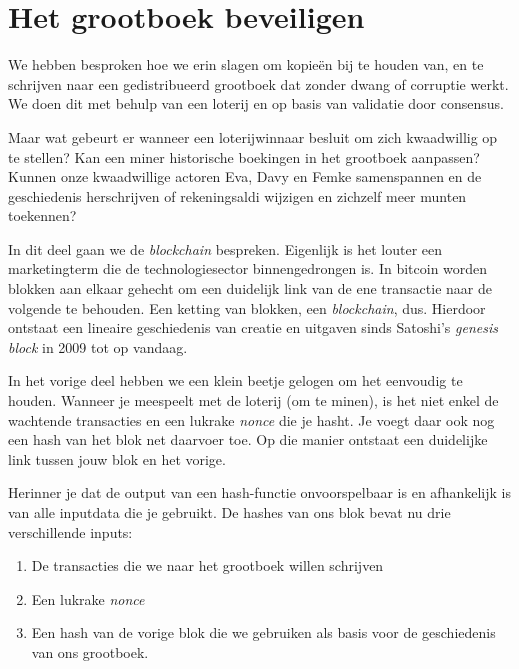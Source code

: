 
\chapter{Het grootboek beveiligen}
We hebben besproken hoe we erin slagen om kopieën bij te houden van, en te schrijven naar een gedistribueerd grootboek dat zonder dwang of corruptie werkt. We doen dit met behulp van een loterij en op basis van validatie door consensus.

Maar wat gebeurt er wanneer een loterijwinnaar besluit om zich kwaadwillig op te stellen? Kan een miner historische boekingen in het grootboek aanpassen? Kunnen onze kwaadwillige actoren Eva, Davy en Femke samenspannen en de geschiedenis herschrijven of rekeningsaldi wijzigen en zichzelf meer munten toekennen?

In dit deel gaan we de \textit{blockchain} bespreken. Eigenlijk is het louter een marketingterm die de technologiesector binnengedrongen is. In bitcoin worden blokken aan elkaar gehecht om een duidelijk link van de ene transactie naar de volgende te behouden. Een ketting van blokken, een \textit{blockchain}, dus. Hierdoor ontstaat een lineaire geschiedenis van creatie en uitgaven sinds Satoshi’s \textit{genesis block }in 2009 tot op vandaag.

In het vorige deel hebben we een klein beetje gelogen om het eenvoudig te houden. Wanneer je meespeelt met de loterij (om te minen), is het niet enkel de wachtende transacties en een lukrake \textit{nonce} die je hasht. Je voegt daar ook nog een hash van het blok net daarvoer toe. Op die manier ontstaat een duidelijke link tussen jouw blok en het vorige.

Herinner je dat de output van een hash-functie onvoorspelbaar is en afhankelijk is van alle inputdata die je gebruikt. De hashes van ons blok bevat nu drie verschillende inputs:

\begin{enumerate}
    \item De transacties die we naar het grootboek willen schrijven
    \item Een lukrake \textit{nonce}
    \item Een hash van de vorige blok die we gebruiken als basis voor de geschiedenis van ons grootboek.
\end{enumerate}




